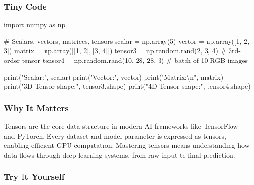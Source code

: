 \documentclass[
  letterpaper,
  DIV=11,
  numbers=noendperiod]{scrreprt}
\newenvironment{Shaded}{\begin{snugshade}}{\end{snugshade}}
\newcommand{\BuiltInTok}[1]{\textcolor[rgb]{0.00,0.23,0.31}{#1}}
\newcommand{\CharTok}[1]{\textcolor[rgb]{0.13,0.47,0.30}{#1}}
\newcommand{\CommentTok}[1]{\textcolor[rgb]{0.37,0.37,0.37}{#1}}
\newcommand{\DecValTok}[1]{\textcolor[rgb]{0.68,0.00,0.00}{#1}}
\newcommand{\ImportTok}[1]{\textcolor[rgb]{0.00,0.46,0.62}{#1}}
\newcommand{\NormalTok}[1]{\textcolor[rgb]{0.00,0.23,0.31}{#1}}
\newcommand{\OperatorTok}[1]{\textcolor[rgb]{0.37,0.37,0.37}{#1}}
\newcommand{\StringTok}[1]{\textcolor[rgb]{0.13,0.47,0.30}{#1}}
\begin{document}
\subsubsection{Tiny Code}\label{tiny-code-108}

\begin{Shaded}
\begin{Highlighting}[]
\ImportTok{import}\NormalTok{ numpy }\ImportTok{as}\NormalTok{ np}

\CommentTok{\# Scalars, vectors, matrices, tensors}
\NormalTok{scalar }\OperatorTok{=}\NormalTok{ np.array(}\DecValTok{5}\NormalTok{)}
\NormalTok{vector }\OperatorTok{=}\NormalTok{ np.array([}\DecValTok{1}\NormalTok{, }\DecValTok{2}\NormalTok{, }\DecValTok{3}\NormalTok{])}
\NormalTok{matrix }\OperatorTok{=}\NormalTok{ np.array([[}\DecValTok{1}\NormalTok{, }\DecValTok{2}\NormalTok{], [}\DecValTok{3}\NormalTok{, }\DecValTok{4}\NormalTok{]])}
\NormalTok{tensor3 }\OperatorTok{=}\NormalTok{ np.random.rand(}\DecValTok{2}\NormalTok{, }\DecValTok{3}\NormalTok{, }\DecValTok{4}\NormalTok{)   }\CommentTok{\# 3rd{-}order tensor}
\NormalTok{tensor4 }\OperatorTok{=}\NormalTok{ np.random.rand(}\DecValTok{10}\NormalTok{, }\DecValTok{28}\NormalTok{, }\DecValTok{28}\NormalTok{, }\DecValTok{3}\NormalTok{)  }\CommentTok{\# batch of 10 RGB images}

\BuiltInTok{print}\NormalTok{(}\StringTok{"Scalar:"}\NormalTok{, scalar)}
\BuiltInTok{print}\NormalTok{(}\StringTok{"Vector:"}\NormalTok{, vector)}
\BuiltInTok{print}\NormalTok{(}\StringTok{"Matrix:}\CharTok{\textbackslash{}n}\StringTok{"}\NormalTok{, matrix)}
\BuiltInTok{print}\NormalTok{(}\StringTok{"3D Tensor shape:"}\NormalTok{, tensor3.shape)}
\BuiltInTok{print}\NormalTok{(}\StringTok{"4D Tensor shape:"}\NormalTok{, tensor4.shape)}
\end{Highlighting}
\end{Shaded}

\subsubsection{Why It Matters}\label{why-it-matters-6}

Tensors are the core data structure in modern AI frameworks like
TensorFlow and PyTorch. Every dataset and model parameter is expressed
as tensors, enabling efficient GPU computation. Mastering tensors means
understanding how data flows through deep learning systems, from raw
input to final prediction.

\subsubsection{Try It Yourself}\label{try-it-yourself-108}
\end{document}
